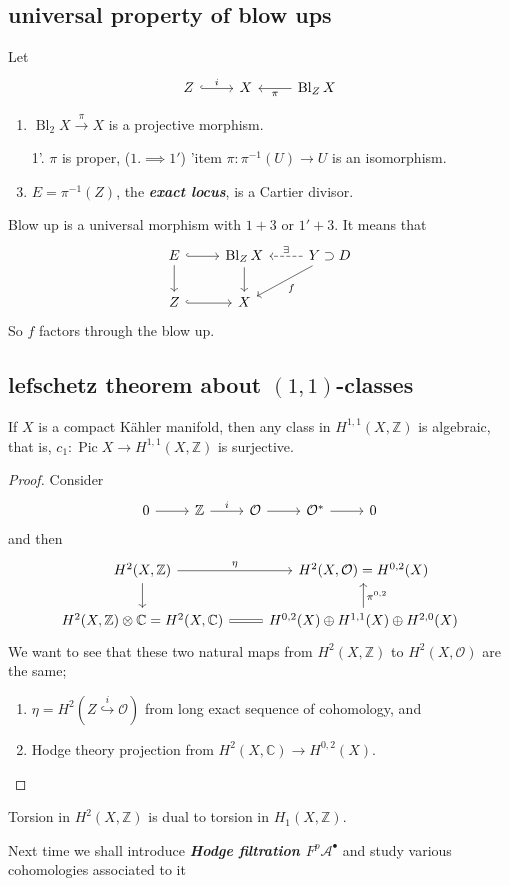 \documentclass{article}
\newcommand{\Z}{\mathbb{Z}}
\newcommand{\C}{\mathbb{C}}
\newcommand{\Ac}{\mathcal{A}}
\newcommand{\Oc}{\mathcal{O}}
\DeclareMathOperator{\Bl}{Bl}
\DeclareMathOperator{\Pic}{Pic}
\begin{document}
\subsection{universal property of blow ups}
Let
\[\begin{tikzcd}
	Z\arrow[r,hook,"i"]&X&\Bl_ZX\arrow[l,"\pi"]
\end{tikzcd}\]
\begin{enumerate}
	\item $\Bl_2X\overset{\pi}{\to}X$ is a projective morphism.
	\item[1'.] $\pi$ is proper, ($1.\implies1'$)
	'item $\pi:\pi^{-1}(U)\to U$ is an isomorphism.
	\item $E=\pi^{-1}(Z)$, the \textbf{\textit{exact locus}}, is a Cartier divisor.
\end{enumerate}
\begin{prop}
	Blow up is a universal morphism with $1+3$ or $1'+3$. It means that
	\[\begin{tikzcd}
		E\arrow[r,hook]\arrow[d]&\Bl_ZX\arrow[d]&Y\supset D\arrow[l,dashed,swap,"\exists"]\arrow[dl,"f"]\\
		Z\arrow[r,hook]&X
	\end{tikzcd}\]
	So $f$ factors through the blow up.
\end{prop}

\subsection{lefschetz theorem about $(1,1)$-classes}
\begin{thm}
	If $X$ is a compact Kähler manifold, then any class in $H^{1,1}(X,\Z)$ is algebraic, that is, $c_1:\Pic X\to H^{1,1}(X,\Z)$ is surjective.
\end{thm}
\begin{proof}
	Consider
	\[\begin{tikzcd}
		0\arrow[r]&\Z\arrow[r,"i"]&\Oc\arrow[r]&\Oc^*\arrow[r]&0
	\end{tikzcd}\]
	and then
	\[\begin{tikzcd}
		H^2(X,\Z)\arrow[r,"\eta"]\arrow[d]&H^2(X,\Oc)=H^{0,2}(X)\\
		H^2(X,\Z)\otimes\C=H^2(X,\C)\arrow[r,equal]&H^{0,2}(X)\oplus H^{1,1}(X)\oplus H^{2,0}(X)\arrow[u,"\pi^{0,2}",swap]
	\end{tikzcd}\]
	We want to see that these two natural maps from $H^2(X,\Z)$ to $H^2(X,\Oc)$ are the same;
	\begin{enumerate}
		\item $\eta=H^2(Z\overset{i}{\hookrightarrow}\Oc)$ from long exact sequence of cohomology, and
		\item Hodge theory projection from $H^2(X,\C)\to H^{0,2}(X)$.
	\end{enumerate}
\end{proof}
\begin{exercise}
	Torsion in $H^2(X,\Z)$ is dual to torsion in $H_1(X,\Z)$.
\end{exercise}
\begin{remark}
	Next time we shall introduce \textbf{\textit{Hodge filtration $F^p\Ac^\bullet$}} and study various cohomologies associated to it
\end{remark}
\end{document}
